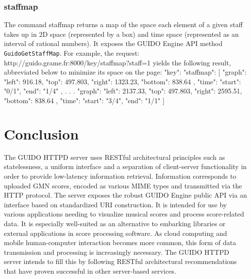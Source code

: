 \documentclass[11pt,a4paper]{article}
\newenvironment{code}		{\vspace{-2mm} \fontsize{8.5pt}{12pt}\selectfont \verbatim}{\endverbatim\vspace{-2mm}}
\newenvironment{mcode}		{\vspace{-2mm} \fontsize{10pt}{12pt}\selectfont \verbatim}{\endverbatim\vspace{-2mm}}
\begin{document}
\subsubsection{staffmap}\label{subsection:staffmap}
The command staffmap returns a map of the space each element of a given staff takes up in 2D space (represented by a box) and time space (represented as an interval of rational numbers).  It exposes the GUIDO Engine API method \verb=GuidoGetStaffMap=.  For example, the request:
\begin{code}
 http://guido.grame.fr:8000/key/staffmap?staff=1
\end{code}
yields the following result, abbreviated below to minimize its space on the page:
\begin{mcode}
{
  "key": {
    "staffmap": [
      {
        "graph": {
          "left": 916.18,
          "top": 497.803,
          "right": 1323.23,
          "bottom": 838.64
        },
        "time": {
          "start": "0/1",
          "end": "1/4"
        }
      },
      .
      .
      .
      {
        "graph": {
          "left": 2137.33,
          "top": 497.803,
          "right": 2595.51,
          "bottom": 838.64
        },
        "time": {
          "start": "3/4",
          "end": "1/1"
        }
      }
    ]
  }
}
\end{mcode}

\section{Conclusion}
The GUIDO HTTPD server uses RESTful architectural principles such as statelessness, a uniform interface and a separation of client-server functionality in order to provide low-latency information retrieval.  Information corresponds to uploaded GMN scores, encoded as various MIME types and transmitted via the HTTP protocol.  The server exposes the robust GUIDO Engine public API via an interface based on standardized URI construction.  It is intended for use by various applications needing to visualize musical scores and process score-related data.  It is especially well-suited as an alternative to embarking libraries or external applications in score processing software.  As cloud computing and mobile human-computer interaction becomes more common, this form of data transmission and processing is increasingly necessary.  The GUIDO HTTPD server intends to fill this by following RESTful architectural recommendations that have proven successful in other server-based services.\par

\balance

%

\end{document}
